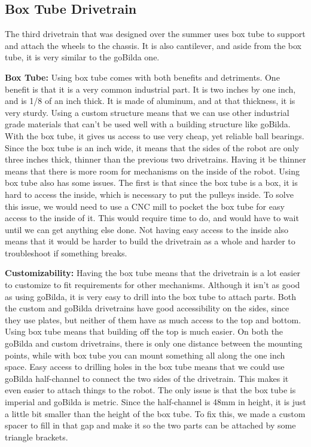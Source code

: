 

\subsection{Box Tube Drivetrain}
\par The third drivetrain that was designed over the summer uses box tube to support and attach the wheels to the chassis. It is also cantilever, and aside from the box tube, it is very similar to the goBilda one.



\par \textbf{Box Tube:} Using box tube comes with both benefits and detriments. One benefit is that it is a very common industrial part. It is two inches by one inch, and is 1/8 of an inch thick. It is made of aluminum, and at that thickness, it is very sturdy. Using a custom structure means that we can use other industrial grade materials that can't be used well with a building structure like goBilda. With the box tube, it gives us access to use very cheap, yet reliable ball bearings. Since the box tube is an inch wide, it means that the sides of the robot are only three inches thick, thinner than the previous two drivetrains. Having it be thinner means that there is more room for mechanisms on the inside of the robot. Using box tube also has some issues. The first is that since the box tube is a box, it is hard to access the inside, which is necessary to put the pulleys inside. To solve this issue, we would need to use a CNC mill to pocket the box tube for easy access to the inside of it. This would require time to do, and would have to wait until we can get anything else done. Not having easy access to the inside also means that it would be harder to build the drivetrain as a whole and harder to troubleshoot if something breaks.

\newpage


\par \textbf{Customizability:} Having the box tube means that the drivetrain is a lot easier to customize to fit requirements for other mechanisms. Although it isn't as good as using goBilda, it is very easy to drill into the box tube to attach parts. Both the custom and goBilda drivetrains have good accessibility on the sides, since they use plates, but neither of them have as much access to the top and bottom. Using box tube means that building off the top is much easier. On both the goBilda and custom drivetrains, there is only one distance between the mounting points, while with box tube you can mount something all along the one inch space. Easy access to drilling holes in the box tube means that we could use goBilda half-channel to connect the two sides of the drivetrain. This makes it even easier to attach things to the robot. The only issue is that the box tube is imperial and goBilda is metric. Since the half-channel is 48mm in height, it is just a little bit smaller than the height of the box tube. To fix this, we made a custom spacer to fill in that gap and make it so the two parts can be attached by some triangle brackets.

